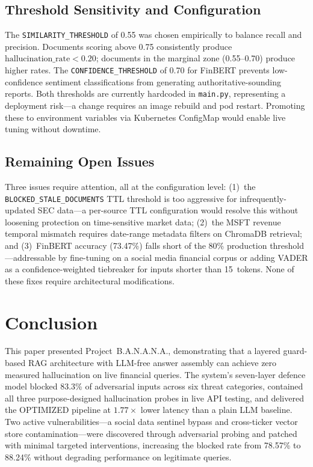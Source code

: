 \documentclass[10pt,journal,compsoc]{IEEEtran}
\newcommand{\banana}{\mbox{B.A.N.A.N.A.}}
\begin{document}
\subsection{Threshold Sensitivity and Configuration}

The \texttt{SIMILARITY\_THRESHOLD} of 0.55 was chosen empirically to
balance recall and precision.
Documents scoring above 0.75 consistently produce
$\text{hallucination\_rate} < 0.20$; documents in the marginal zone
(0.55--0.70) produce higher rates.
The \texttt{CONFIDENCE\_THRESHOLD} of 0.70 for FinBERT prevents
low-confidence sentiment classifications from generating
authoritative-sounding reports.
Both thresholds are currently hardcoded in \texttt{main.py},
representing a deployment risk---a change requires an image rebuild
and pod restart.
Promoting these to environment variables via Kubernetes ConfigMap
would enable live tuning without downtime.

\subsection{Remaining Open Issues}

Three issues require attention, all at the configuration level:
(1)~the \texttt{BLOCKED\_STALE\_DOCUMENTS} TTL threshold is too
aggressive for infrequently-updated SEC data---a per-source TTL
configuration would resolve this without loosening protection on
time-sensitive market data;
(2)~the MSFT revenue temporal mismatch requires date-range metadata
filters on ChromaDB retrieval; and
(3)~FinBERT accuracy (73.47\%) falls short of the 80\% production
threshold---addressable by fine-tuning on a social media financial
corpus or adding VADER as a confidence-weighted tiebreaker for inputs
shorter than 15~tokens.
None of these fixes require architectural modifications.

\section{Conclusion}
\label{sec:conclusion}

This paper presented Project~\banana{}, demonstrating that a layered
guard-based RAG architecture with LLM-free answer assembly can achieve
zero measured hallucination on live financial queries.
The system's seven-layer defence model blocked 83.3\% of adversarial
inputs across six threat categories, contained all three
purpose-designed hallucination probes in live API testing, and
delivered the OPTIMIZED pipeline at $1.77\times$ lower latency than a
plain LLM baseline.
Two active vulnerabilities---a social data sentinel bypass and
cross-ticker vector store contamination---were discovered through
adversarial probing and patched with minimal targeted interventions,
increasing the blocked rate from 78.57\% to 88.24\% without degrading
performance on legitimate queries.
\end{document}
